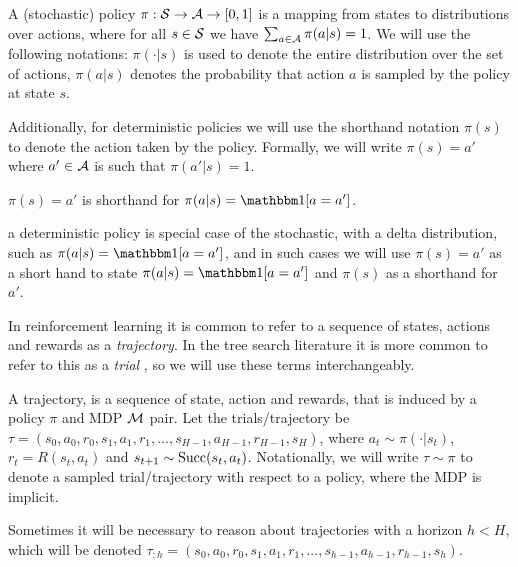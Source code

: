     \begin{defn}
        \label{def:policy}
        A \textnormal{(stochastic) policy} $\pi:\mathcal{S}\rightarrow \mathcal{A} \rightarrow [0,1]$ is a mapping from states to distributions over actions, where for all $s \in \mathcal{S}$ we have $\sum_{a\in\mathcal{A}} \pi(a|s) = 1$. We will use the following notations: $\pi(\cdot|s)$ is used to denote the entire distribution over the set of actions, $\pi(a|s)$ denotes the probability that action $a$ is sampled by the policy at state $s$. 

        Additionally, for \textnormal{deterministic policies} we will use the shorthand notation $\pi(s)$ to denote the action taken by the policy. Formally, we will write $\pi(s)=a'$ where $a'\in\mathcal{A}$ is such that $\pi(a'|s)=1$.

         $\pi(s)=a'$ is shorthand for $\pi(a|s)=\one[a=a']$.

         a deterministic policy is special case of the stochastic, with a delta distribution, such as $\pi(a|s)=\one[a=a']$, and in such cases we will use $\pi(s)=a'$ as a short hand to state $\pi(a|s)=\one[a=a']$ and $\pi(s)$ as a shorthand for $a'$.
    \end{defn}




    In reinforcement learning it is common to refer to a sequence of states, actions and rewards as a \textit{trajectory}. In the tree search literature it is more common to refer to this as a \textit{trial} , so we will use these terms interchangeably.
    
    \begin{defn}
        \label{def:trajectory}
        A \textnormal{trajectory}, is a sequence of state, action and rewards, that is induced by a policy $\pi$ and MDP $\mathcal{M}$ pair. Let the trials/trajectory be $\tau = (s_0, a_0, r_0, s_1, a_1, r_1, ..., s_{H-1}, a_{H-1}, r_{H-1}, s_H)$, where $a_t \sim \pi(\cdot|s_t)$, $r_t=R(s_t,a_t)$ and $s_{t+1} \sim {\textnormal{Succ}(s_t,a_t)}$. Notationally, we will write $\tau\sim\pi$ to denote a sampled trial/trajectory with respect to a policy, where the MDP is implicit.

        Sometimes it will be necessary to reason about trajectories with a horizon $h<H$, which will be denoted $\tau_{:h} = (s_0, a_0, r_0, s_1, a_1, r_1, ..., s_{h-1}, a_{h-1}, r_{h-1}, s_h)$.
    \end{defn}

